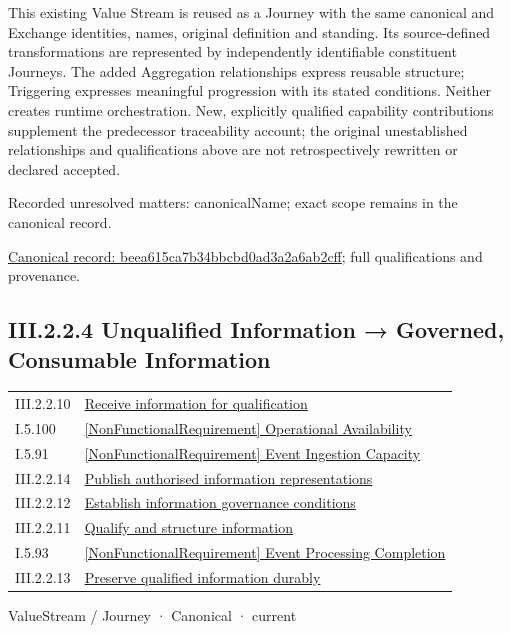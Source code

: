 This existing Value Stream is reused as a Journey with the same canonical and Exchange identities, names, original definition and standing. Its source-defined transformations are represented by independently identifiable constituent Journeys. The added Aggregation relationships express reusable structure; Triggering expresses meaningful progression with its stated conditions. Neither creates runtime orchestration. New, explicitly qualified capability contributions supplement the predecessor traceability account; the original unestablished relationships and qualifications above are not retrospectively rewritten or declared accepted.


{\small Recorded unresolved matters: canonicalName; exact scope remains in the canonical record.}\par
{\footnotesize \href{../../../../continuum/strategy/value-stream/beea615ca7b34bbcbd0ad3a2a6ab2cff.md}{Canonical record: beea615ca7b34bbcbd0ad3a2a6ab2cff}; full qualifications and provenance.}\par
\subsection*{III.2.2.4 Unqualified Information → Governed, Consumable Information}
\label{navigation:III.2.2.4}

\begin{longtable}{p{.22\linewidth}p{.73\linewidth}}
III.2.2.10 & \hyperref[element:28544771580448638e209bb377a25fbe]{Receive information for qualification} \\
I.5.100 & \hyperref[element:65ac0367b7f241149ad1839032004039]{[NonFunctionalRequirement] Operational Availability} \\
I.5.91 & \hyperref[element:75420022c1a7463e91ca48f229a78194]{[NonFunctionalRequirement] Event Ingestion Capacity} \\
III.2.2.14 & \hyperref[element:91da459e860e4f359e440a65f0c94bcb]{Publish authorised information representations} \\
III.2.2.12 & \hyperref[element:ae90f7118fe245659f4524fc8991614d]{Establish information governance conditions} \\
III.2.2.11 & \hyperref[element:cbedc98406674727a9b1eae8d9bc30da]{Qualify and structure information} \\
I.5.93 & \hyperref[element:d1380eec700a492b810354e0798c8146]{[NonFunctionalRequirement] Event Processing Completion} \\
III.2.2.13 & \hyperref[element:e07ef0bcd9444af3a22ab45bbb3afc38]{Preserve qualified information durably} \\
\end{longtable}
\label{element:02e036f18bab400bac261007e39457ee}
{\small ValueStream / Journey · Canonical · current}\par

